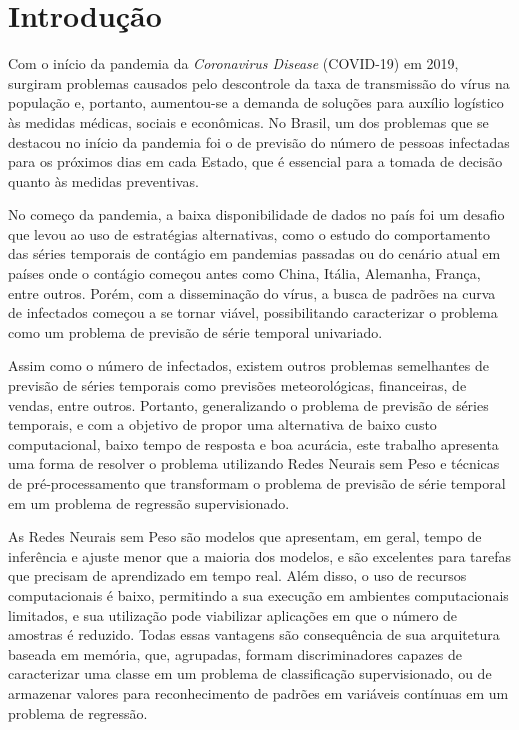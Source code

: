 \chapter{Introdução}

Com o início da pandemia da \textit{Coronavirus Disease} (COVID-19) em 2019, surgiram problemas causados pelo descontrole da taxa de transmissão do vírus na população e, portanto, aumentou-se a demanda de soluções para auxílio logístico às medidas médicas, sociais e econômicas. No Brasil, um dos problemas que se destacou no início da pandemia foi o de previsão do número de pessoas infectadas para os próximos dias em cada Estado, que é essencial para a tomada de decisão quanto às medidas preventivas.

No começo da pandemia, a baixa disponibilidade de dados no país foi um desafio que levou ao uso de estratégias alternativas, como o estudo do comportamento das séries temporais de contágio em pandemias passadas ou do cenário atual em países onde o contágio começou antes como China, Itália, Alemanha, França, entre outros. Porém, com a disseminação do vírus, a busca de padrões na curva de infectados começou a se tornar viável, possibilitando caracterizar o problema como um problema de previsão de série temporal univariado.

Assim como o número de infectados, existem outros problemas semelhantes de previsão de séries temporais como previsões meteorológicas, financeiras, de vendas, entre outros. Portanto, generalizando o problema de previsão de séries temporais, e com a objetivo de propor uma alternativa de baixo custo computacional, baixo tempo de resposta e boa acurácia, este trabalho apresenta uma forma de resolver o problema utilizando Redes Neurais sem Peso e técnicas de pré-processamento que transformam o problema de previsão de série temporal em um problema de regressão supervisionado.

As Redes Neurais sem Peso são modelos que apresentam, em geral, tempo de inferência e ajuste menor que a maioria dos modelos, e são excelentes para tarefas que precisam de aprendizado em tempo real. Além disso, o uso de recursos computacionais é baixo, permitindo a sua execução em ambientes computacionais limitados, e sua utilização pode viabilizar aplicações em que o número de amostras é reduzido. Todas essas vantagens são consequência de sua arquitetura baseada em memória, que, agrupadas, formam discriminadores capazes de caracterizar uma classe em um problema de classificação supervisionado, ou de armazenar valores para reconhecimento de padrões em variáveis contínuas em um problema de regressão.

